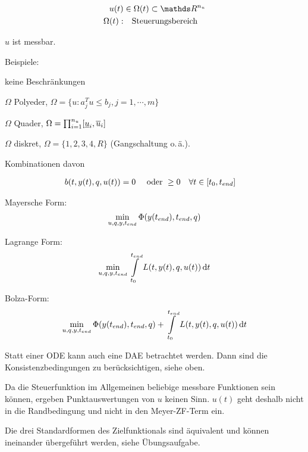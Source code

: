 
\begin{align*}
u(t) & \in \Omega(t) \subset \R^{n_u} \\
\Omega(t): & \quad \text{Steuerungsbereich} \\
\end{align*}

$u$ ist messbar.

Beispiele:

\bitm
\item keine Beschränkungen
\item $\Omega$ Polyeder, $\Omega = \{ u : a_j^T u \leq b_j, j=1,\cdots,m \}$
\item $\Omega$ Quader, $\Omega = \prod_{i=1}^{n_u} [\underline u_i, \overline u_i ]$
\item $\Omega$ diskret, $\Omega = \{ 1,2,3,4,R\}$ (Gangschaltung o.\,ä.).
\item Kombinationen davon
\eitm



\begin{align*}
b(t,y(t), q, u(t)) &= 0 \quad \text{ oder } \geq 0 \quad \forall t \in [t_0, {t_{end}}] 
\end{align*}


\bitm
\item Mayersche Form: \[ \min_{u,q,y,{t_{end}}} \Phi(y({t_{end}}), {t_{end}}, q) \]
\item Lagrange Form: \[ \min_{u,q,y,{t_{end}}} \int\limits_{t_0}^{t_{end}} L(t,y(t),q,u(t)) \,\mathrm d t \]
\item Bolza-Form: \[ \min_{u,q,y,{t_{end}}} \Phi(y({t_{end}}), {t_{end}}, q) + \int\limits_{t_0}^{t_{end}} L(t,y(t),q,u(t)) \,\mathrm d t \]
\eitm


Statt einer ODE kann auch eine DAE betrachtet werden. Dann sind die Konsistenzbedingungen zu berücksichtigen, siehe oben.


Da die Steuerfunktion im Allgemeinen beliebige messbare Funktionen sein können, ergeben Punktauswertungen von $u$ keinen Sinn. $u(t)$ geht deshalb nicht in die Randbedingung und nicht in den Meyer-ZF-Term ein.


Die drei Standardformen des Zielfunktionals sind äquivalent und können ineinander übergeführt werden, siehe Übungsaufgabe.

